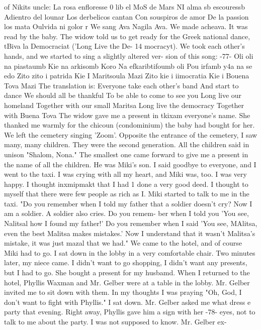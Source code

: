 of Nikits uncle: 
La rosa enfloresse 
0 lib el MoS de Mars 
NI alma sb escouressb 
Adientro del lounar 
Los derbelicos cantan 
Con souspiros de amor 
De la passion los mata 
Oulvida ni golor 
r 
We sang Ava Nagila Ava. We made acheava. It was read by the baby. The widow told 
us to get ready for the Greek national dance, tBiva la Democraciat ('Long Live the De- 14 
mocracyt). We took each other's hands, and we started to sing a slightly altered ver-
sion of this song: 
-77- 
Oli oli na piastaumb 
Kie na arkisomb Koro 
Na efkaribtifoumb oli 
Pou irfamb y4a na se edo 
Zito zito i patrida 
Kie I Maritsoula Mazi 
Zito kie i iimocratia 
Kie i Bouena Tova Mazi 
The translation is: 
Everyone take each other's band 
And start to dance 
We should all be thankful 
To be able to come to see you 
Long live our homeland 
Together with our small Maritsa 
Long live the democracy 
Together with Buena Tova 
The widow gave me a present in tkixam everyone's name. She thanked me warmly for 
the chicoun (condominium) the baby had bought for her. We left the cemetery singing 
'Zoom'. Opposite the entrance of the cemetery, I saw many, many children. They were 
the second generation. All the children said in unison "Shalom, Nona." The smallest 
one came forward to give me a present in the name of all the children. He was Miki's 
son. I said goodbye to everyone, and I went to the taxi. I was crying with all my 
heart, and Miki was, too. I was very happy. I thought inxmipmakt that I had 1 done a 
very good deed. I thought to myself that there were few people as rich as I. 
Miki started to talk to me in the taxi. "Do you remember when I told my father 
that a soldier doesn't cry? Now I am a soldier. A soldier also cries. Do you remem-
ber when I told you 'You see, Nalitsal how I found my father!' Do you remember when I 
said 'You see, MAlitsa, even the best Malitsa makes mistakes.' Now I understand that it 
wasn't Malitsa's mistake, it was just mazal that we had." 
We came to the hotel, and of course Miki had to go. I sat down in the lobby in a 
very comfortable chair. Two minutes later, my niece came. I didn't want to go shopping, 
I didn't want any presents, but I had to go. She bought a present for my husbamd. 
When I returned to the hotel, Phyllis Waxman and Mr. Gelber were at a table in the 
lobby. Mr. Gelber invited me to sit down with them. In my thoughts I was praying "Oh, 
God, I don't want to fight with Phyllis." I sat down. Mr. Gelber asked me what dress 
e party that 
evening. Right away, Phyllis gave him a sign with her 
-78- 
eyes, not to talk to me about the party. I was not supposed to know. Mr. Gelber ex-
